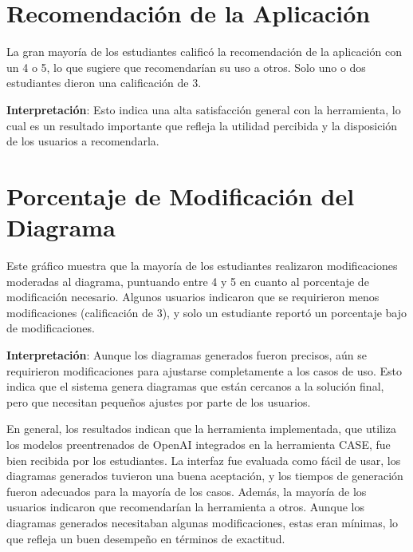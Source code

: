 \section{Recomendación de la Aplicación}

La gran mayoría de los estudiantes calificó la recomendación de la aplicación con un 4 o 5, lo que sugiere que recomendarían su uso a otros. Solo uno o dos estudiantes dieron una calificación de 3.

\textbf{Interpretación}: Esto indica una alta satisfacción general con la herramienta, lo cual es un resultado importante que refleja la utilidad percibida y la disposición de los usuarios a recomendarla.

\section{Porcentaje de Modificación del Diagrama}

Este gráfico muestra que la mayoría de los estudiantes realizaron modificaciones moderadas al diagrama, puntuando entre 4 y 5 en cuanto al porcentaje de modificación necesario. Algunos usuarios indicaron que se requirieron menos modificaciones (calificación de 3), y solo un estudiante reportó un porcentaje bajo de modificaciones.

\textbf{Interpretación}: Aunque los diagramas generados fueron precisos, aún se requirieron modificaciones para ajustarse completamente a los casos de uso. Esto indica que el sistema genera diagramas que están cercanos a la solución final, pero que necesitan pequeños ajustes por parte de los usuarios.

En general, los resultados indican que la herramienta implementada, que utiliza los modelos preentrenados de OpenAI integrados en la herramienta CASE, fue bien recibida por los estudiantes. La interfaz fue evaluada como fácil de usar, los diagramas generados tuvieron una buena aceptación, y los tiempos de generación fueron adecuados para la mayoría de los casos. Además, la mayoría de los usuarios indicaron que recomendarían la herramienta a otros. Aunque los diagramas generados necesitaban algunas modificaciones, estas eran mínimas, lo que refleja un buen desempeño en términos de exactitud.
